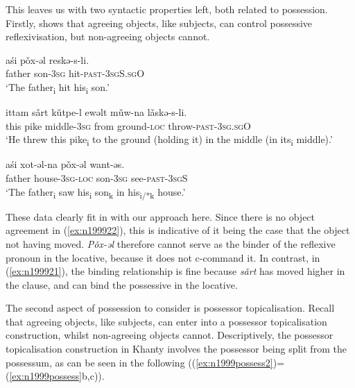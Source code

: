 \documentclass[output=paper
,modfonts
,nonflat]{langsci/langscibook}
\begin{document}
This leaves us with two syntactic properties left, both related to possession.
Firstly, \citet{nikolaeva1999} shows that agreeing objects, like subjects, can control possessive reflexivisation, but non-agreeing objects cannot. 

\begin{exe}
\ex \citet[][344]{nikolaeva1999} \label{ex:n1999possessrep}
\begin{xlist}
\ex
{\gll a\'{s}i p\v{o}x-əl reskə-s-li.\\
father son-\textsc{3sg} hit-\textsc{past-3sgS.sgO}\\
\glt `The father\textsubscript{i} hit his\textsubscript{i} son.'}

\ex
{\gll ittam s\v{a}rt k\v{u}tpe-l ewəlt m\v{u}w-na l\v{a}skə-s-li.\\
this pike middle-\textsc{3sg} from ground-\textsc{loc} throw-\textsc{past-3sg.sgO}\\
\glt `He threw this pike\textsubscript{i} to the ground (holding it) in the middle (in its\textsubscript{i} middle).'} \label{ex:n199921}

\ex
{\gll a\'{s}i xot-əl-na p\v{o}x-əl want-əs.\\
father house-\textsc{3sg-loc} son-\textsc{3sg} see-\textsc{past-3sgS}\\
\glt `The father\textsubscript{i} saw his\textsubscript{i} son\textsubscript{k} in his\textsubscript{i/*k} house.'} \label{ex:n199922}

\end{xlist}
\end{exe}

\noindent These data clearly fit in with our approach here. 
Since there is no object agreement in (\ref{ex:n199922}), this is indicative of it being the case that the \theme {} object not having moved. 
\emph{P\v{o}x-əl} therefore cannot serve as the binder of the reflexive pronoun in the locative, because it does not c-command it.
In contrast, in (\ref{ex:n199921}), the binding relationship is fine because \emph{s\v{a}rt} has moved higher in the clause, and can bind the possessive in the locative.





The second aspect of possession to consider is possessor topicalisation.
Recall that agreeing objects, like subjects, can enter into a possessor topicalisation construction, whilst non-agreeing objects cannot.
Descriptively, the possessor topicalisation construction in Khanty involves the possessor being split from the possessum, as can be seen in the following ((\ref{ex:n1999possess2})=(\ref{ex:n1999possess}b,c)).
\end{document}
